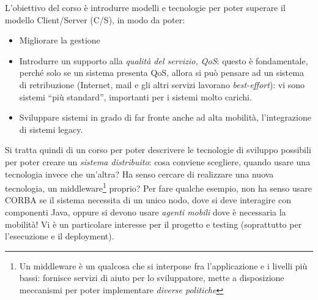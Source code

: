 L'obiettivo del corso è introdurre modelli e tecnologie per poter superare il modello Client/Server (C/S), in modo
da poter:
\begin{itemize}
 \item Migliorare la gestione
 \item Introdurre un supporto alla \textit{qualità del servizio, QoS}: questo è fondamentale, perché solo se un sistema
 presenta QoS, allora si può pensare ad un sistema di retribuzione (Internet, mail e gli altri servizi
lavorano \textit{best-effort}): vi sono sistemi ``più standard'', importanti per i sistemi molto carichi.
\item Sviluppare sistemi in grado di far fronte anche ad alta mobilità, l'integrazione di sistemi legacy.
\end{itemize}
Si tratta quindi di un corso per poter descrivere le tecnologie di sviluppo possibili per poter creare un
\textit{sistema distribuito}: cosa conviene scegliere, quando usare una tecnologia invece che un'altra? Ha senso cercare
di realizzare una nuova tecnologia, un middleware\footnote{Un middleware è un qualcosa che si interpone fra
l'applicazione e i livelli più bassi: fornisce servizi di aiuto per lo sviluppatore, mette a disposizione meccanismi per
poter implementare \textit{diverse politiche}} proprio? Per fare qualche esempio, non ha senso usare CORBA se il sistema
necessita di un unico nodo, dove si deve interagire con componenti Java, oppure si devono usare \textit{agenti mobili}
dove è necessaria la mobilità! Vi è un particolare interesse per il progetto e testing (soprattutto per l'esecuzione e
il deployment).